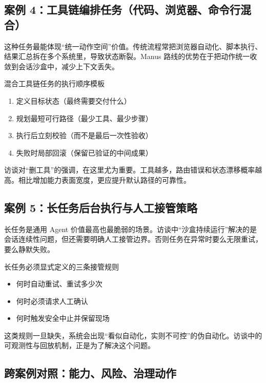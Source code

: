 \documentclass[a4paper]{article}
\begin{document}
\subsection{案例 4：工具链编排任务（代码、浏览器、命令行混合）}

这种任务最能体现“统一动作空间”价值。传统流程常把浏览器自动化、脚本执行、结果汇总拆在多个系统里，导致状态断裂。Manus 路线的优势在于把动作统一收敛到会话沙盒中，减少上下文丢失。

\begin{importantbox}{混合工具链任务的执行顺序模板}
\begin{enumerate}
    \item 定义目标状态（最终需要交付什么）
    \item 规划最短可行路径（最少工具、最少步骤）
    \item 执行后立刻校验（而不是最后一次性验收）
    \item 失败时局部回滚（保留已验证的中间成果）
\end{enumerate}
\end{importantbox}

访谈对“删工具”的强调，在这里尤为重要。工具越多，路由错误和状态漂移概率越高。相比增加能力表面宽度，更应提升默认路径的可靠性。

\subsection{案例 5：长任务后台执行与人工接管策略}

长任务是通用 Agent 价值最高也最脆弱的场景。访谈中“沙盒持续运行”解决的是会话连续性问题，但还需要明确人工接管边界。否则任务在异常时要么无限重试，要么静默失败。

\begin{warningbox}{长任务必须显式定义的三条接管规则}
\begin{itemize}
    \item 何时自动重试、重试多少次
    \item 何时必须请求人工确认
    \item 何时触发安全中止并保留现场
\end{itemize}
\end{warningbox}

这类规则一旦缺失，系统会出现“看似自动化，实则不可控”的伪自动化。访谈中的可观测性与回放机制，正是为了解决这个问题。

\subsection{跨案例对照：能力、风险、治理动作}
\end{document}

